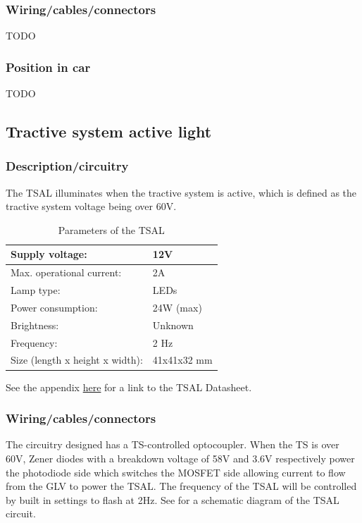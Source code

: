 \documentclass{article}
\begin{document}
\subsubsection{Wiring/cables/connectors}
TODO

\subsubsection{Position in car}
TODO

\subsection{Tractive system active light}\label{tractive_system_active_light}
\subsubsection{Description/circuitry}
The TSAL illuminates when the tractive system is active, which is defined as the tractive system voltage being over 60V.

	\begin{table}[H]
	    \centering
	    \begin{tabular}{|l|l|}
	    \hline
	    Supply voltage: & 12V \\ \hline
	    Max. operational current: &  2A\\ \hline
	    Lamp type: & LEDs \\ \hline
	    Power consumption: & 24W (max)\\ \hline
	    Brightness: & Unknown\\ \hline
	    Frequency: & 2 Hz \\ \hline
	    Size (length x height x width): & 41x41x32 mm \\ \hline
	    \end{tabular}
	    \caption{Parameters of the TSAL}
	    \label{TSALparameters}
	\end{table}
	
See the appendix \hyperlink{TSALdatasheet}{here} for a link to the TSAL Datasheet.

\subsubsection{Wiring/cables/connectors}
The circuitry designed has a TS-controlled optocoupler. When the TS is over 60V, Zener diodes with a breakdown voltage of 58V and 3.6V respectively power the photodiode side which switches the MOSFET side allowing current to flow from the GLV to power the TSAL. The frequency of the TSAL will be controlled by built in settings to flash at 2Hz. See  for a schematic diagram of the TSAL circuit.
\end{document}
